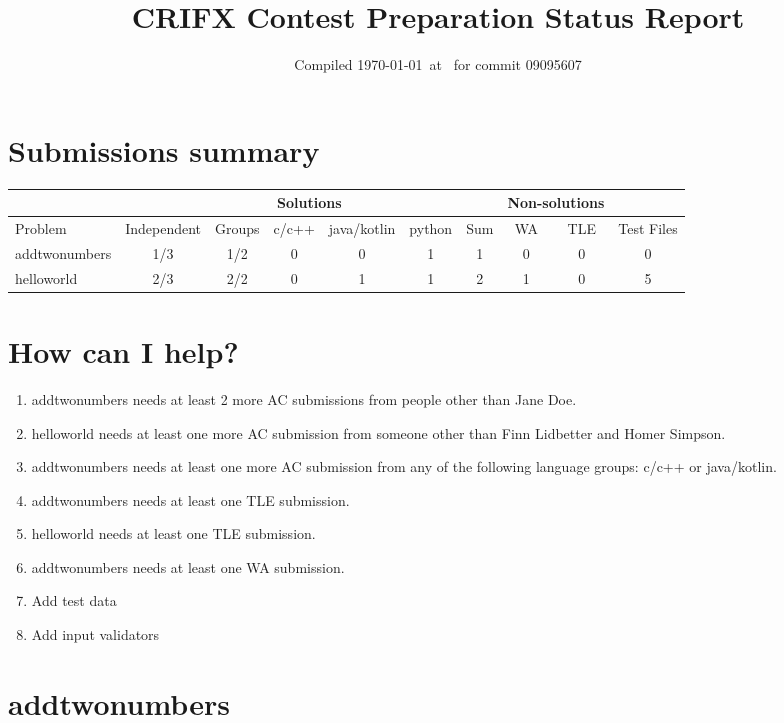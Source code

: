 \documentclass{article}%
\title{CRIFX Contest Preparation Status Report}%
\date{Compiled \today~at \DTMcurrenttime\DTMcurrentzone~for commit 09095607}%
\begin{document}
%
\normalsize%
\maketitle%
\section{Submissions summary}%
\label{sec:Submissionssummary}%
\begin{tabular}{|l|c|c|c|c|c|c|c|c|c|}%
\hline%
\rowcolor{cyan}%
&\multicolumn{6}{c}{{\tiny Solutions}}&\multicolumn{2}{|c|}{{\tiny Non-solutions}}&\\%
\hline%
\rowcolor{cyan}%
{\tiny Problem}&{\tiny Independent}&{\tiny Groups}&{\tiny c/c++}&{\tiny java/kotlin}&{\tiny python}&{\tiny Sum}&{\tiny WA}&{\tiny TLE}&{\tiny Test Files}\\%
\hline%
addtwonumbers&\cellcolor{insufficientred}1/3&\cellcolor{insufficientred}1/2&0&0&1&1&0&0&0\\%
\hline%
helloworld&\cellcolor{insufficientred}2/3&\cellcolor{sufficientgreen}2/2&0&1&1&2&1&0&5\\%
\hline%
\end{tabular}

%
\section{How can I help?}%
\label{sec:HowcanIhelp?}%
\begin{enumerate}%
\item%
addtwonumbers needs at least 2 more AC submissions from people other than Jane Doe.%
\item%
helloworld needs at least one more AC submission from someone other than Finn Lidbetter and Homer Simpson.%
\item%
addtwonumbers needs at least one more AC submission from any of the following language groups: c/c++ or java/kotlin.%
\item%
addtwonumbers needs at least one TLE submission.%
\item%
helloworld needs at least one TLE submission.%
\item%
addtwonumbers needs at least one WA submission.%
\item%
Add test data%
\item%
Add input validators%
\end{enumerate}

%
\newpage%
\section{addtwonumbers}%
\label{sec:addtwonumbers}%
\end{document}
